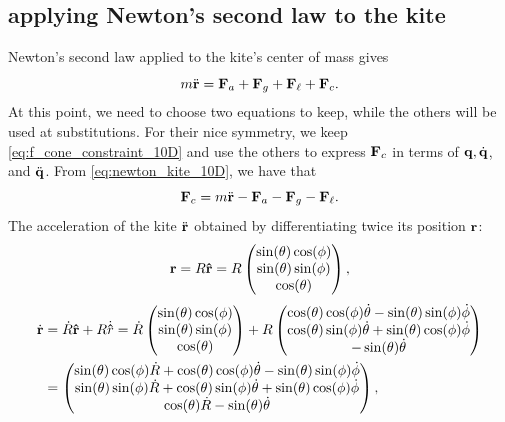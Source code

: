 \subsection{applying Newton's second law to the kite}

Newton's second law applied to the kite's center of mass gives
\begin{equation} \label{eq:newton_kite_10D}
    m \ddot{\vb r} = \vb F_a + \vb F_g + \vb F_\ell + \vb F_c.
\end{equation}
%
At this point, we need to choose two equations to keep, while the others will be used at substitutions.
For their nice symmetry, we keep \eqref{eq:f_cone_constraint_10D} and use the others to express $\vb F_c$ in terms of $\vb q, \dot{\vb q}$, and $\ddot{\vb q}$.
From \eqref{eq:newton_kite_10D}, we have that
\begin{equation} \label{eq:f_cone_newton_10D}
    \vb F_c = m \ddot{\vb r} - \vb F_a - \vb F_g - \vb F_\ell.
\end{equation}
%
The acceleration of the kite $\ddot{\vb r}$ obtained by differentiating twice its position $\vb r$:
\begin{equation}
    \vb r = R \vu r = R \begin{pmatrix}
        \sin(\theta) \cos(\phi) \\
        \sin(\theta) \sin(\phi) \\
        \cos(\theta)
    \end{pmatrix},
\end{equation}
%
\begin{equation}\begin{split}
    \dot{\vb r} &= \dot R \vu r + R \dot{\vu r}
    = \dot R \begin{pmatrix}
        \sin(\theta) \cos(\phi) \\
        \sin(\theta) \sin(\phi) \\
        \cos(\theta)
    \end{pmatrix} + R \begin{pmatrix}
        \cos(\theta) \cos(\phi) \dot \theta - \sin(\theta) \sin(\phi) \dot \phi \\
        \cos(\theta) \sin(\phi) \dot \theta + \sin(\theta) \cos(\phi) \dot \phi \\
        -\sin(\theta) \dot \theta
    \end{pmatrix} \\
    &= \begin{pmatrix}
        \sin(\theta) \cos(\phi) \dot R + \cos(\theta) \cos(\phi) \dot \theta - \sin(\theta) \sin(\phi) \dot \phi \\
        \sin(\theta) \sin(\phi) \dot R + \cos(\theta) \sin(\phi) \dot \theta + \sin(\theta) \cos(\phi) \dot \phi \\
        \cos(\theta) \dot R - \sin(\theta) \dot \theta
    \end{pmatrix},
\end{split}\end{equation}
